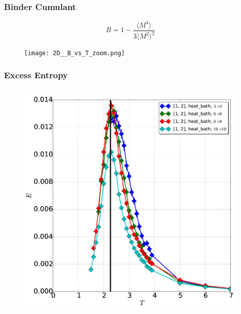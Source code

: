 \documentclass{beamer}
\begin{document}

\begin{frame}
\frametitle{Binder Cumulant}

$$ B = 1 - \frac{\langle M^4 \rangle}{3 \langle M^2 \rangle ^2} $$

\begin{figure}
\texttt{[image: 2D\_\_B\_vs\_T\_zoom.png]}
\end{figure}

\end{frame}


\begin{frame}
\frametitle{Excess Entropy}

\begin{figure}
\includegraphics[height=0.6\linewidth]{vlad.png}
\end{figure}

\end{frame}


\end{document}
